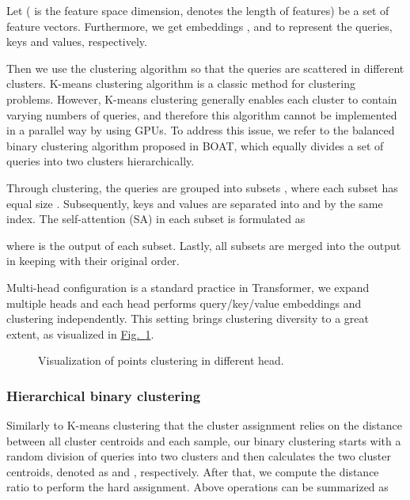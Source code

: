 \documentclass[lettersize,journal]{IEEEtran}
\begin{document}
Let  ( is the feature space dimension,  denotes the length of features) be a set of feature vectors. 
Furthermore, we get embeddings ,  and  to represent the queries, 
keys and values, respectively. 

Then we use the clustering algorithm so that the queries are scattered in different clusters.
K-means clustering algorithm is a classic method for clustering problems. 
However, K-means clustering generally enables each cluster to contain varying numbers of queries, 
and therefore this algorithm cannot be implemented in a parallel way by using GPUs. 
To address this issue, we refer to the balanced binary clustering algorithm proposed in BOAT\cite{boat}, 
which equally divides a set of queries into two clusters hierarchically. 

Through clustering, the queries  are grouped into  subsets , where each subset has equal size .
Subsequently, keys  and values  are separated into  and  by the same index. 
The self-attention (SA) in each subset is formulated as

where  is the output of each subset. 
Lastly, all subsets  are merged into the output  in keeping with their original order. 



Multi-head configuration is a standard practice in Transformer, we expand multiple heads and each head performs query/key/value embeddings and clustering independently.
This setting brings clustering diversity to a great extent, as visualized in \hyperref[fig:multi-head]{Fig.~\ref*{fig:multi-head}}.

\begin{figure}[t]
  \centering
{}

   \caption{Visualization of points clustering in different head.}
   \label{fig:multi-head}
\end{figure}

\subsubsection*{\bf Hierarchical binary clustering} 
Similarly to K-means clustering that the cluster assignment relies on the distance between all cluster centroids and each sample, 
our binary clustering starts with a random division of queries   into two clusters and then calculates the two cluster centroids, 
denoted as  and , respectively. After that, we compute the distance ratio to perform the hard assignment. Above operations can be summarized as
\end{document}
